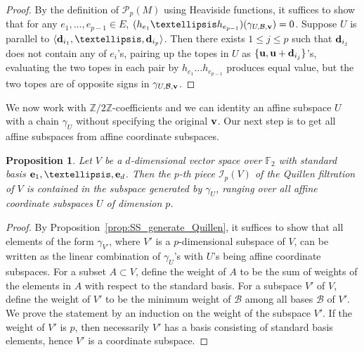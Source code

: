 \documentclass{amsart}
\newtheorem{proposition}[theorem]{Proposition}
\newcommand\Bcal{{\mathcal B}}
\newcommand\Ical{{\mathcal I}}
\newcommand\Pcal{{\mathcal P}}
\newcommand\dd{{\bf d}}
\newcommand\ee{{\bf e}}
\newcommand\uu{{\bf u}}
\newcommand\vv{{\bf v}}
\newcommand\Ztwo{{\mathbb Z}/2{\mathbb Z}}
\newcommand\FF{{\mathbb F}}
\begin{document}
{\begin{proof}
By the definition of $\Pcal_p(M)$ using Heaviside functions, it suffices to show that for any $e_1,\ldots,e_{p-1}\in E$, $(h_{e_1}\ldots h_{e_{p-1}})(\gamma_{U,\Bcal,\vv})=0$.
Suppose $U$ is parallel to $\langle\dd_{i_1},\ldots,\dd_{i_p} \rangle$.
Then there exists $1\leq j\leq p$ such that $\dd_{i_j}$ does not contain any of $e_i$'s, pairing up the topes in $U$ as $\{\uu,\uu+\dd_{i_j}\}$'s, evaluating the two topes in each pair by $h_{e_1}\ldots h_{e_{p-1}}$ produces equal value, but the two topes are of opposite signs in $\gamma_{U,\Bcal,\vv}$.
\end{proof}

We now work with $\Ztwo$-coefficients and we can identity an affine subspace $U$ with a chain $\gamma_U$ without specifying the original $\vv$. Our next step is to get all affine subspaces from affine coordinate subspaces.

\begin{proposition} \label{prop:coor_to_all}
Let $V$ be a $d$-dimensional vector space over $\FF_2$ with standard basis $\ee_1, \dots, \ee_d$.
Then the $p$-th piece $\Ical_p(V)$ of the Quillen filtration of $V$ is contained in the subspace generated by $\gamma_U$, ranging over all affine coordinate subspaces $U$ of dimension $p$.
\end{proposition}

\begin{proof}
By Proposition~\ref{prop:SS_generate_Quillen}, it suffices to show that all elements of the form $\gamma_{V'}$, where $V'$ is a $p$-dimensional subspace of $V$, can be written as the linear combination of $\gamma_U$'s with $U$'s being affine coordinate subspaces.
For a subset $A\subset V$, define the weight of $A$ to be the sum of weights of the elements in $A$ with respect to the standard basis.
For a subspace $V'$ of $V$, define the weight of $V'$ to be the minimum weight of $\mathcal{B}$ among all bases $\mathcal{B}$ of $V'$.
We prove the statement by an induction on the weight of the subspace $V'$.
If the weight of $V'$ is $p$, then necessarily $V'$ has a basis consisting of standard basis elements, hence $V'$ is a coordinate subspace.


\end{proof}}
\end{document}
